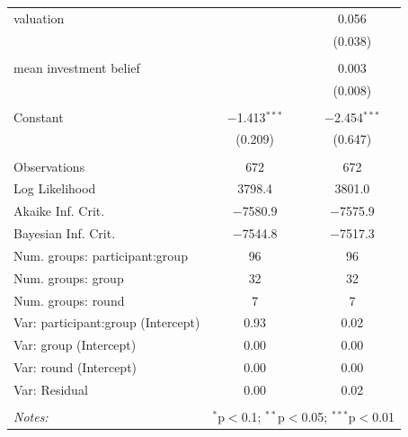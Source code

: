\begin{table}[!htbp]
\begin{tabular}{@{\extracolsep{5pt}}lcc}
 valuation &  & 0.056 \\ 
  &  & (0.038) \\ 
  & & \\ 
 mean investment belief &  & 0.003 \\ 
  &  & (0.008) \\ 
  & & \\ 
 Constant & $-$1.413$^{***}$ & $-$2.454$^{***}$ \\ 
  & (0.209) & (0.647) \\ 
  & & \\ 
  \hline
Observations & 672 & 672 \\ 
Log Likelihood & 3798.4 & 3801.0 \\ 
Akaike Inf. Crit. & $-$7580.9 & $-$7575.9 \\ 
Bayesian Inf. Crit. & $-$7544.8 & $-$7517.3 \\
\hline
Num. groups: participant:group     & 96     &   96   \\
Num. groups: group               & 32      &    32  \\
Num. groups: round                         & 7   & 7        \\
\hline
Var: participant:group (Intercept) & 0.93   & 0.02     \\
Var: group (Intercept)           & 0.00   & 0.00     \\
Var: round (Intercept)           & 0.00    & 0.00    \\
Var: Residual                    & 0.00     &  0.02  \\
\hline
\hline \\[-1.8ex] 
\textit{Notes:} & \multicolumn{2}{l}{$^{*}$p$<$0.1; $^{**}$p$<$0.05; $^{***}$p$<$0.01} \\ 
\end{tabular} 
\end{table} 